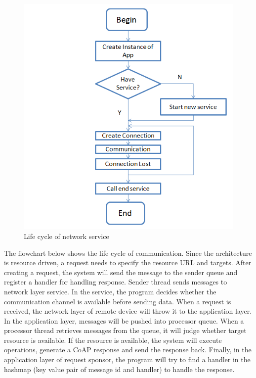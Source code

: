 \documentclass{Nan_Thesis}
\begin{document}
\begin{figure}[H] 
  \centering 
      \includegraphics[scale=1]{pic/networklifecycle.png} 
  \caption{Life cycle of network service}
\end{figure} 

The flowchart below shows the life cycle of communication. Since the architecture is resource driven, a request needs to specify the resource URL and targets. After creating a request, the system will send the message to the sender queue and register a handler for handling response. Sender thread sends messages to network layer service. In the service, the program decides whether the communication channel is available before sending data.  When a request is received, the network layer of remote device will throw it to the application layer. In the application layer, messages will be pushed into processor queue. When a processor thread retrieves messages from the queue, it will judge whether target resource is available. If the resource is available, the system will execute operations, generate a CoAP response and send the response back. Finally, in the application layer of request sponsor, the program will try to find a handler in the hashmap (key value pair of message id and handler) to handle the response.
\end{document}
